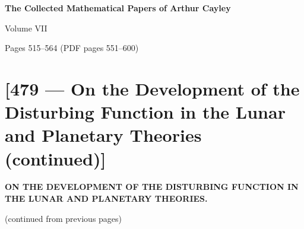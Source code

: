 \documentclass[11pt,a4paper]{article}
\theoremstyle{plain}
\theoremstyle{definition}
\theoremstyle{remark}
\begin{document}
\begin{center}
\Large\bfseries The Collected Mathematical Papers of Arthur Cayley

\vspace{0.5em}
\large Volume VII

\vspace{1em}
\normalsize Pages 515--564 (PDF pages 551--600)
\end{center}

\vspace{2em}

\section*{[479 --- On the Development of the Disturbing Function in the Lunar and Planetary Theories (continued)]}


\begin{center}
\textbf{ON THE DEVELOPMENT OF THE DISTURBING FUNCTION IN THE LUNAR AND PLANETARY THEORIES.}
\end{center}

(continued from previous pages)

\bigskip
\end{document}
